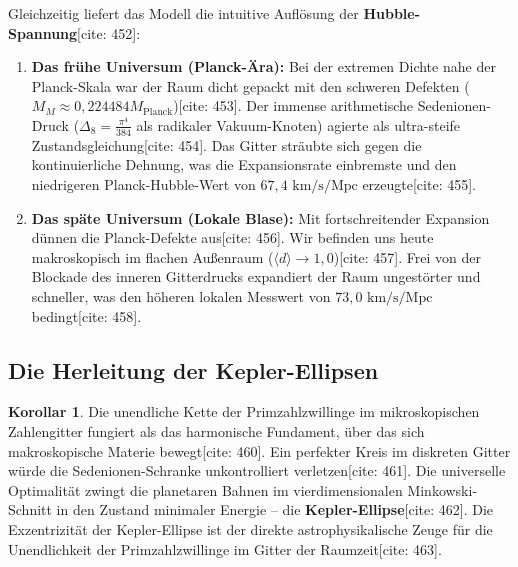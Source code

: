 \documentclass[11pt,a4paper]{article}
\newcommand{\Mplanck}{M_{\text{Planck}}}
\theoremstyle{definition}
\newtheorem{corollary}[theorem]{Korollar}
\begin{document}
	Gleichzeitig liefert das Modell die intuitive Auflösung der \textbf{Hubble-Spannung}[cite: 452]:
	\begin{enumerate}
		\item \textbf{Das frühe Universum (Planck-Ära):} Bei der extremen Dichte nahe der Planck-Skala war der Raum dicht gepackt mit den schweren Defekten ($M_M \approx 0{,}224484 \Mplanck$)[cite: 453]. Der immense arithmetische Sedenionen-Druck ($\Delta_8 = \frac{\pi^4}{384}$ als radikaler Vakuum-Knoten) agierte als ultra-steife Zustandsgleichung[cite: 454]. Das Gitter sträubte sich gegen die kontinuierliche Dehnung, was die Expansionsrate einbremste und den niedrigeren Planck-Hubble-Wert von $67{,}4 \text{ km/s/Mpc}$ erzeugte[cite: 455].
		\item \textbf{Das späte Universum (Lokale Blase):} Mit fortschreitender Expansion dünnen die Planck-Defekte aus[cite: 456]. Wir befinden uns heute makroskopisch im flachen Außenraum ($\langle d \rangle \rightarrow 1{,}0$)[cite: 457]. Frei von der Blockade des inneren Gitterdrucks expandiert der Raum ungestörter und schneller, was den höheren lokalen Messwert von $73{,}0 \text{ km/s/Mpc}$ bedingt[cite: 458].
	\end{enumerate}
	
	\subsection{Die Herleitung der Kepler-Ellipsen}
	\begin{corollary}
		Die unendliche Kette der Primzahlzwillinge im mikroskopischen Zahlengitter fungiert als das harmonische Fundament, über das sich makroskopische Materie bewegt[cite: 460]. Ein perfekter Kreis im diskreten Gitter würde die Sedenionen-Schranke unkontrolliert verletzen[cite: 461]. Die universelle Optimalität zwingt die planetaren Bahnen im vierdimensionalen Minkowski-Schnitt in den Zustand minimaler Energie -- die \textbf{Kepler-Ellipse}[cite: 462]. Die Exzentrizität der Kepler-Ellipse ist der direkte astrophysikalische Zeuge für die Unendlichkeit der Primzahlzwillinge im Gitter der Raumzeit[cite: 463].
	\end{corollary}
	
\end{document}
